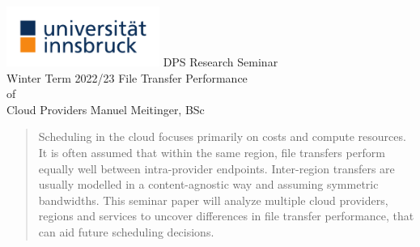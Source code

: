 \documentclass[a4paper,bibliography=totoc]{scrartcl}
\begin{document}
\begin{titlepage}\centering\Large
    \includegraphics[width=5cm]{uibk_logo.pdf}
    \vfill
    DPS Research Seminar\\Winter Term 2022/23
    \vfill
    {\titlefont\huge File Transfer Performance\\of\\Cloud Providers}
    \vfill
    Manuel Meitinger, BSc
    \vfill
\end{titlepage}

\begin{abstract}
Scheduling in the cloud focuses primarily on costs and compute resources. It is often assumed that within the same region, file transfers perform equally well between intra-provider endpoints. Inter-region transfers are usually modelled in a content-agnostic way and assuming symmetric bandwidths. This seminar paper will analyze multiple cloud providers, regions and services to uncover differences in file transfer performance, that can aid future scheduling decisions.
\end{abstract}

\vfill

\tableofcontents

\vfill

\newpage
\end{document}
